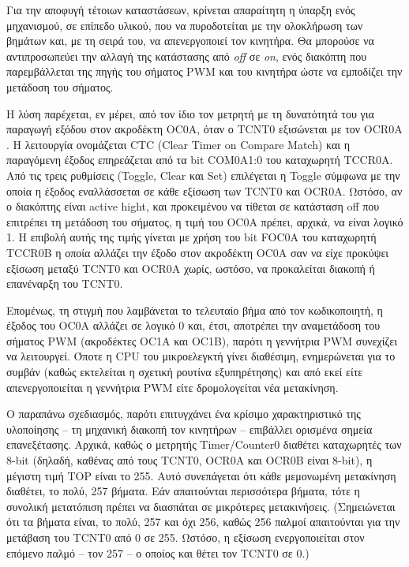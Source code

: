 Για την αποφυγή τέτοιων καταστάσεων, κρίνεται απαραίτητη η ύπαρξη ενός
μηχανισμού, σε επίπεδο υλικού, που να πυροδοτείται με την ολοκλήρωση των βημάτων
και, με τη σειρά του, να απενεργοποιεί τον κινητήρα. Θα μπορούσε να
αντιπροσωπεύει την αλλαγή της κατάστασης από \emph{off} σε \emph{on}, ενός
διακόπτη που παρεμβάλλεται της πηγής του σήματος PWM και του κινητήρα ώστε να
εμποδίζει την μετάδοση του σήματος.

Η λύση παρέχεται, εν μέρει, από τον ίδιο τον μετρητή με τη δυνατότητά του για
παραγωγή εξόδου στον ακροδέκτη OC0A, όταν ο TCNT0 εξισώνεται με τον OCR0A
\parencite[98--99,107]{atmel13}. Η λειτουργία ονομάζεται CTC (\textenglish{Clear
Timer on Compare Match}) και η παραγόμενη έξοδος επηρεάζεται από τα bit COM0A1:0
του καταχωρητή TCCR0A. Από τις τρεις ρυθμίσεις (\textenglish{Toggle, Clear} και
\textenglish{Set}) επιλέγεται η \textenglish{Toggle} σύμφωνα με την οποία η
έξοδος εναλλάσσεται σε κάθε εξίσωση των TCNT0 και OCR0A. Ωστόσο, αν ο διακόπτης
είναι \textenglish{active hight}, και προκειμένου να τίθεται σε κατάσταση
\textenglish{off} που επιτρέπει τη μετάδοση του σήματος, η τιμή του OC0A πρέπει,
αρχικά, να είναι λογικό 1. Η επιβολή αυτής της τιμής γίνεται με χρήση του bit
FOC0A του καταχωρητή TCCR0B η οποία αλλάζει την έξοδο στον ακροδέκτη OC0A σαν
να είχε προκύψει εξίσωση μεταξύ TCNT0 και OCR0A χωρίς, ωστόσο, να προκαλείται
διακοπή ή επανέναρξη του TCNT0.

Επομένως, τη στιγμή που λαμβάνεται το τελευταίο βήμα από τον κωδικοποιητή, η
έξοδος του OC0A αλλάζει σε λογικό 0 και, έτσι, αποτρέπει την αναμετάδοση του
σήματος PWM (ακροδέκτες OC1A και OC1B), παρότι η γεννήτρια PWM συνεχίζει να
λειτουργεί. Όποτε η CPU του μικροελεγκτή γίνει διαθέσιμη, ενημερώνεται για το
συμβάν (καθώς εκτελείται η σχετική ρουτίνα εξυπηρέτησης) και από εκεί είτε
απενεργοποιείται η γεννήτρια PWM είτε δρομολογείται νέα μετακίνηση.

%
%

Ο παραπάνω σχεδιασμός, παρότι επιτυγχάνει ένα κρίσιμο χαρακτηριστικό της
υλοποίησης -- τη μηχανική διακοπή τον κινητήρων -- επιβάλλει ορισμένα σημεία
επανεξέτασης. Αρχικά, καθώς ο μετρητής \textenglish{Timer\slash Counter0}
διαθέτει καταχωρητές των 8-bit (δηλαδή, καθένας από τους TCNT0, OCR0A και
OCR0B είναι 8-bit), η μέγιστη τιμή TOP είναι το 255. Αυτό συνεπάγεται ότι
κάθε μεμονωμένη μετακίνηση διαθέτει, το πολύ, 257 βήματα. Εάν απαιτούνται
περισσότερα βήματα, τότε η συνολική μετατόπιση πρέπει να διασπάται σε
μικρότερες μετακινήσεις. (Σημειώνεται ότι τα βήματα είναι, το πολύ, 257 και όχι
256, καθώς 256 παλμοί απαιτούνται για την μετάβαση του TCNT0 από 0 σε 255.
Ωστόσο, η εξίσωση ενεργοποιείται στον επόμενο παλμό -- τον 257 -- ο οποίος και
θέτει τον TCNT0 σε 0.)

